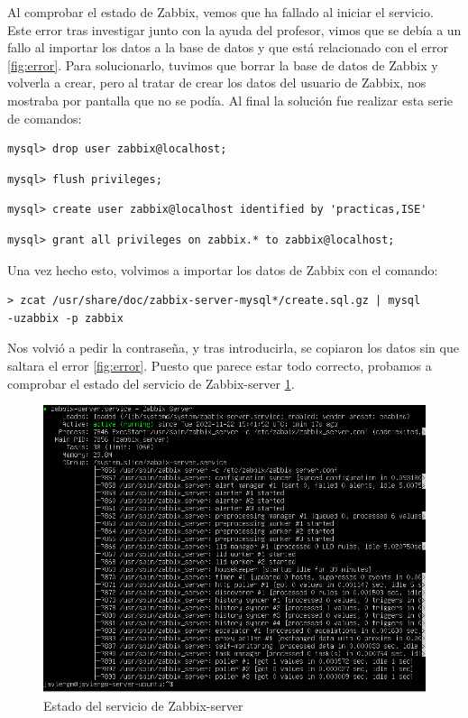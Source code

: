 Al comprobar el estado de Zabbix, vemos que ha fallado al iniciar el servicio. Este error tras investigar junto con la ayuda del profesor, vimos que se debía a un fallo al importar los datos a la base de datos y que está relacionado con el error \ref{fig:error}. Para solucionarlo, tuvimos que borrar la base de datos de Zabbix y volverla a crear, pero al tratar de crear los datos del usuario de Zabbix, nos mostraba por pantalla que no se podía. Al final la solución fue realizar esta serie de comandos:

\begin{lstlisting}
mysql> drop user zabbix@localhost; 
\end{lstlisting}

\begin{lstlisting}
mysql> flush privileges;
\end{lstlisting}

\begin{lstlisting}
mysql> create user zabbix@localhost identified by 'practicas,ISE'
\end{lstlisting}

\begin{lstlisting}
mysql> grant all privileges on zabbix.* to zabbix@localhost;
\end{lstlisting}

Una vez hecho esto, volvimos a importar los datos de Zabbix con el comando:

\begin{lstlisting}
> zcat /usr/share/doc/zabbix-server-mysql*/create.sql.gz | mysql
-uzabbix -p zabbix
\end{lstlisting}

Nos volvió a pedir la contraseña, y tras introducirla, se copiaron los datos sin que saltara el error \ref{fig:error}. Puesto que parece estar todo correcto, probamos a comprobar el estado del servicio de Zabbix-server \ref{fig:estado-zabbix-correcto}.

\begin{figure}[H]
  \centering
  \includegraphics[scale=0.7]{Captura9}
  \caption{Estado del servicio de Zabbix-server}
  \label{fig:estado-zabbix-correcto}
\end{figure}

